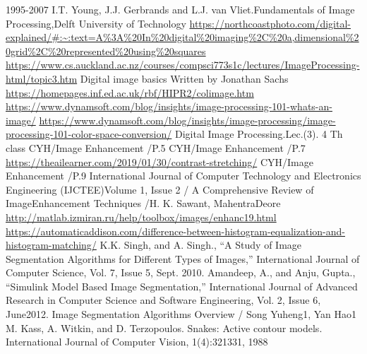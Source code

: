 \documentclass[english,a4,12pt]{report}
\begin{document}
    \clearpage
    \pagestyle{fancy}
    \begin{thebibliography}{99}
        \lhead{}
        \cfoot{\bfseries \thepage}
         1995-2007 I.T. Young, J.J. Gerbrands and L.J. van Vliet.Fundamentals of Image Processing,Delft University of Technology
         \url{https://northcoastphoto.com/digital-explained/#:~:text=A%3A\%20In\%20digital\%20imaging\%2C\%20a,dimensional\%20grid\%2C\%20represented\%20using\%20squares}
         \url{https://www.cs.auckland.ac.nz/courses/compsci773s1c/lectures/ImageProcessing-html/topic3.htm}
         Digital image basics Written by Jonathan Sachs
         \url{https://homepages.inf.ed.ac.uk/rbf/HIPR2/colimage.htm}
         \url{https://www.dynamsoft.com/blog/insights/image-processing-101-whats-an-image/}
         \url{https://www.dynamsoft.com/blog/insights/image-processing/image-processing-101-color-space-conversion/}
         Digital Image Processing.Lec.(3). 4 Th class
         CYH/Image Enhancement /P.5
         CYH/Image Enhancement /P.7
         \url{https://theailearner.com/2019/01/30/contrast-stretching/}
         CYH/Image Enhancement /P.9
         International Journal of Computer Technology and Electronics Engineering (IJCTEE)Volume 1, Issue 2 / A Comprehensive Review of ImageEnhancement Techniques /H. K. Sawant, MahentraDeore
         \url{http://matlab.izmiran.ru/help/toolbox/images/enhanc19.html}
         \url{https://automaticaddison.com/difference-between-histogram-equalization-and-histogram-matching/}
         K.K. Singh, and A. Singh., “A Study of Image Segmentation Algorithms for Different Types of Images,” International Journal of Computer Science, Vol. 7, Issue 5, Sept. 2010.
         Amandeep, A., and Anju, Gupta., “Simulink Model Based Image Segmentation,” International Journal of Advanced Research in Computer Science and Software Engineering, Vol. 2, Issue 6, June2012.
         Image Segmentation Algorithms Overview / Song Yuheng1, Yan Hao1
         M. Kass, A. Witkin, and D. Terzopoulos. Snakes: Active contour models. International Journal of Computer Vision, 1(4):321{331, 1988}

\end{thebibliography}
\end{document}
